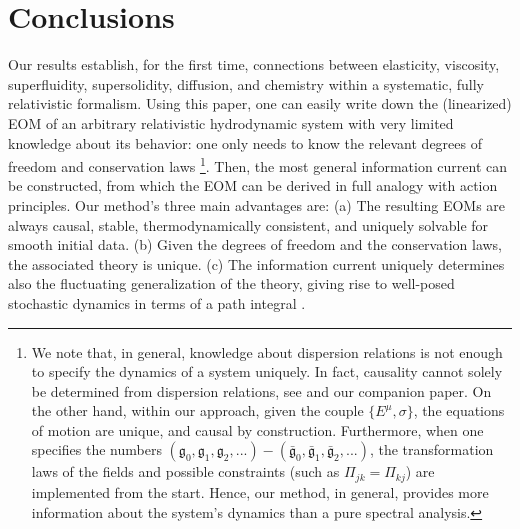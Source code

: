 \documentclass[aps,prl,singlecolumn,nofootinbib]{revtex4-2}
\theoremstyle{definition}
\theoremstyle{theorem}
\begin{document}
\section{Conclusions}
Our results establish, for the first time, connections between elasticity, viscosity, superfluidity, supersolidity, diffusion, and chemistry within a systematic, fully relativistic formalism. Using this paper, one can easily write down the (linearized) EOM of an arbitrary relativistic hydrodynamic system with very limited knowledge about its behavior: one only needs to know the relevant degrees of freedom and conservation laws \footnote{We note that, in general, knowledge about dispersion relations is not enough to specify the dynamics of a system uniquely. In fact, causality cannot solely be determined from dispersion relations, see \cite{Gavassino:2023mad} and our companion paper. On the other hand, within our approach, given the couple $\{E^\mu,\sigma\}$, the equations of motion are unique, and causal by construction. Furthermore, when one specifies the numbers $(\mathfrak{g}_0,\mathfrak{g}_1,\mathfrak{g}_2,...)-(\bar{\mathfrak{g}}_0,\bar{\mathfrak{g}}_1,\bar{\mathfrak{g}}_2,...)$, the transformation laws of the fields and possible constraints (such as $\Pi_{jk}=\Pi_{kj}$) are implemented from the start. Hence, our method, in general, provides more information about the system's dynamics than a pure spectral analysis.}. Then, the most general information current can be constructed, from which the EOM can be derived in full analogy with action principles. Our method's three main advantages are: (a) The resulting EOMs are always causal, stable, thermodynamically consistent, and uniquely solvable for smooth initial data. (b) Given the degrees of freedom and the conservation laws, the associated theory is unique. (c) The information current uniquely determines also the fluctuating generalization of the theory, giving rise to well-posed stochastic dynamics in terms of a path integral \cite{Mullins:2023tjg}.
 

\end{document}
